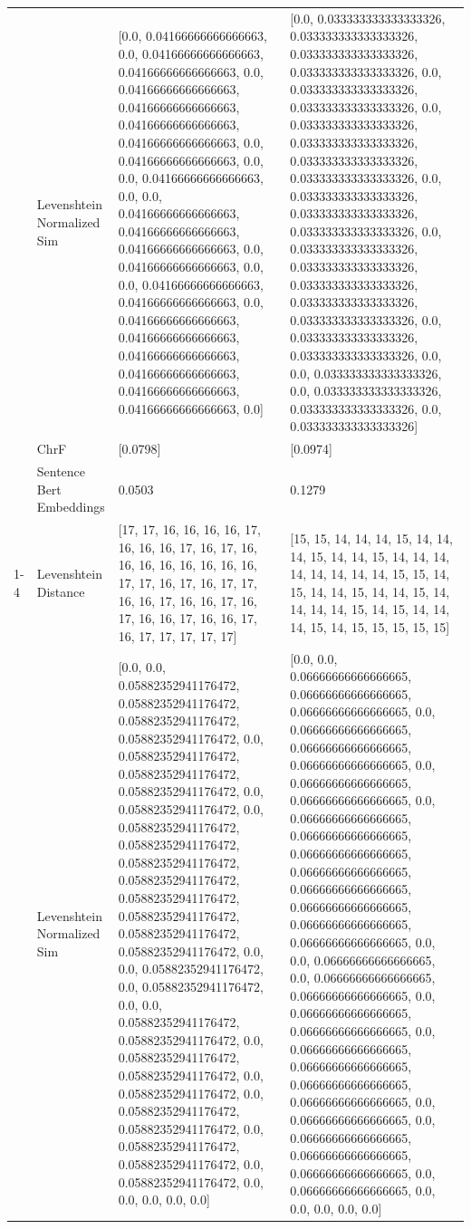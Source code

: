 \begin{tabular}{llll}
 & Levenshtein Normalized Sim & [0.0, 0.04166666666666663, 0.0, 0.04166666666666663, 0.04166666666666663, 0.0, 0.04166666666666663, 0.04166666666666663, 0.04166666666666663, 0.04166666666666663, 0.0, 0.04166666666666663, 0.0, 0.0, 0.04166666666666663, 0.0, 0.0, 0.04166666666666663, 0.04166666666666663, 0.04166666666666663, 0.0, 0.04166666666666663, 0.0, 0.0, 0.04166666666666663, 0.04166666666666663, 0.0, 0.04166666666666663, 0.04166666666666663, 0.04166666666666663, 0.04166666666666663, 0.04166666666666663, 0.04166666666666663, 0.0] & [0.0, 0.033333333333333326, 0.033333333333333326, 0.033333333333333326, 0.033333333333333326, 0.0, 0.033333333333333326, 0.033333333333333326, 0.0, 0.033333333333333326, 0.033333333333333326, 0.033333333333333326, 0.033333333333333326, 0.0, 0.033333333333333326, 0.033333333333333326, 0.033333333333333326, 0.0, 0.033333333333333326, 0.033333333333333326, 0.033333333333333326, 0.033333333333333326, 0.033333333333333326, 0.0, 0.033333333333333326, 0.033333333333333326, 0.0, 0.0, 0.033333333333333326, 0.0, 0.033333333333333326, 0.033333333333333326, 0.0, 0.033333333333333326] \\
 & ChrF & [0.0798] & [0.0974] \\
 & Sentence Bert Embeddings & 0.0503 & 0.1279 \\
\cline{1-4}
\multirow[t]{4}{*}{Marakara ti gitei} & Levenshtein Distance & [17, 17, 16, 16, 16, 16, 17, 16, 16, 16, 17, 16, 17, 16, 16, 16, 16, 16, 16, 16, 16, 17, 17, 16, 17, 16, 17, 17, 16, 16, 17, 16, 16, 17, 16, 17, 16, 16, 17, 16, 16, 17, 16, 17, 17, 17, 17, 17] & [15, 15, 14, 14, 14, 15, 14, 14, 14, 15, 14, 14, 15, 14, 14, 14, 14, 14, 14, 14, 14, 15, 15, 14, 15, 14, 14, 15, 14, 14, 15, 14, 14, 14, 14, 15, 14, 15, 14, 14, 14, 15, 14, 15, 15, 15, 15, 15] \\
 & Levenshtein Normalized Sim & [0.0, 0.0, 0.05882352941176472, 0.05882352941176472, 0.05882352941176472, 0.05882352941176472, 0.0, 0.05882352941176472, 0.05882352941176472, 0.05882352941176472, 0.0, 0.05882352941176472, 0.0, 0.05882352941176472, 0.05882352941176472, 0.05882352941176472, 0.05882352941176472, 0.05882352941176472, 0.05882352941176472, 0.05882352941176472, 0.05882352941176472, 0.0, 0.0, 0.05882352941176472, 0.0, 0.05882352941176472, 0.0, 0.0, 0.05882352941176472, 0.05882352941176472, 0.0, 0.05882352941176472, 0.05882352941176472, 0.0, 0.05882352941176472, 0.0, 0.05882352941176472, 0.05882352941176472, 0.0, 0.05882352941176472, 0.05882352941176472, 0.0, 0.05882352941176472, 0.0, 0.0, 0.0, 0.0, 0.0] & [0.0, 0.0, 0.06666666666666665, 0.06666666666666665, 0.06666666666666665, 0.0, 0.06666666666666665, 0.06666666666666665, 0.06666666666666665, 0.0, 0.06666666666666665, 0.06666666666666665, 0.0, 0.06666666666666665, 0.06666666666666665, 0.06666666666666665, 0.06666666666666665, 0.06666666666666665, 0.06666666666666665, 0.06666666666666665, 0.06666666666666665, 0.0, 0.0, 0.06666666666666665, 0.0, 0.06666666666666665, 0.06666666666666665, 0.0, 0.06666666666666665, 0.06666666666666665, 0.0, 0.06666666666666665, 0.06666666666666665, 0.06666666666666665, 0.06666666666666665, 0.0, 0.06666666666666665, 0.0, 0.06666666666666665, 0.06666666666666665, 0.06666666666666665, 0.0, 0.06666666666666665, 0.0, 0.0, 0.0, 0.0, 0.0] \\

\end{tabular}
